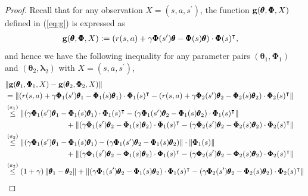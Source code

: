 \documentclass{article} %
\def\eqref#1{equation~\ref{#1}}
\theoremstyle{plain}
\theoremstyle{definition}
\theoremstyle{remark}
\renewcommand{\eqref}[1]{(\ref{#1})}
\begin{document}
{\begin{proof}

Recall that for any observation $X=(s, a, s^\prime)$, the function ${\mathbf{g}}(\pmb{\theta}, \pmb{\Phi}, X)$ defined in \eqref{eq:g} is expressed as
\begin{align*}
    {\mathbf{g}}(\pmb{\theta}, \pmb{\Phi}, X)&:= (r(s,a)+\gamma \pmb{\Phi}(s^\prime) \pmb{\theta}-\pmb{\Phi}(s)\pmb{\theta})\cdot\pmb{\Phi}(s)^\intercal,
\end{align*}
and hence we have the following inequality for any parameter pairs $(\pmb{\theta}_1, \pmb{\Phi}_1)$ and $(\pmb{\theta}_2, \pmb{\lambda}_2)$ with $X=(s,a,s^\prime)$,
\begin{align*}
   &\| \bg(\pmb{\theta}_1, \pmb{\Phi}_1, X)- \bg(\pmb{\theta}_2, \pmb{\Phi}_2, X)\|\allowdisplaybreaks\\
   &=\left\|(r(s,a)+\gamma \pmb{\Phi}_1(s^\prime)\pmb{\theta}_1-\pmb{\Phi}_1(s)\pmb{\theta}_1)\cdot\pmb{\Phi}_1(s)^\intercal-(r(s,a)+\gamma \pmb{\Phi}_2(s^\prime) \pmb{\theta}_2-\pmb{\Phi}_2(s)\pmb{\theta}_2)\cdot\pmb{\Phi}_2(s)^\intercal\right\|\allowdisplaybreaks\\
    &\overset{(a_1)}{\leq} \left\|(\gamma \pmb{\Phi}_1(s^\prime) \pmb{\theta}_1-\pmb{\Phi}_1(s)\pmb{\theta}_1)\cdot\pmb{\Phi}_1(s)^\intercal-(\gamma \pmb{\Phi}_1(s^\prime) \pmb{\theta}_2-\pmb{\Phi}_1(s)\pmb{\theta}_2)\cdot\pmb{\Phi}_1(s)^\intercal\right\|\nonumber\allowdisplaybreaks\\
    &\qquad\qquad\qquad\qquad+\left\|(\gamma \pmb{\Phi}_1(s^\prime) \pmb{\theta}_2-\pmb{\Phi}_1(s)\pmb{\theta}_2)\cdot\pmb{\Phi}_1(s)^\intercal-(\gamma \pmb{\Phi}_2(s^\prime) \pmb{\theta}_2-\pmb{\Phi}_2(s)\pmb{\theta}_2)\cdot\pmb{\Phi}_2(s)^\intercal\right\|\allowdisplaybreaks\\
   &\overset{(a_2)}{\leq} \left\|(\gamma \pmb{\Phi}_1(s^\prime) \pmb{\theta}_1-\pmb{\Phi}_1(s)\pmb{\theta}_1)-(\gamma \pmb{\Phi}_1(s^\prime) \pmb{\theta}_2-\pmb{\Phi}_1(s)\pmb{\theta}_2)\right\|\cdot\left\|\pmb{\Phi}_1(s)\right\|\allowdisplaybreaks\\
   &\qquad\qquad\qquad\qquad+\left\|(\gamma \pmb{\Phi}_1(s^\prime) \pmb{\theta}_2-\pmb{\Phi}_1(s)\pmb{\theta}_2)\cdot\pmb{\Phi}_1(s)^\intercal-(\gamma \pmb{\Phi}_2(s^\prime) \pmb{\theta}_2-\pmb{\Phi}_2(s)\pmb{\theta}_2)\cdot\pmb{\Phi}_2(s)^\intercal\right\|\allowdisplaybreaks\\
   &\overset{(a_3)}{\leq} (1+\gamma)\left\|\pmb{\theta}_1-\pmb{\theta}_2\right\|+\left\|(\gamma \pmb{\Phi}_1(s^\prime) \pmb{\theta}_2-\pmb{\Phi}_1(s)\pmb{\theta}_2)\cdot\pmb{\Phi}_1(s)^\intercal-(\gamma \pmb{\Phi}_2(s^\prime) \pmb{\theta}_2-\pmb{\Phi}_2(s)\pmb{\theta}_2)\cdot\pmb{\Phi}_2(s)^\intercal\right\|\allowdisplaybreaks\\

\end{align*}
\end{proof}}
\end{document}
